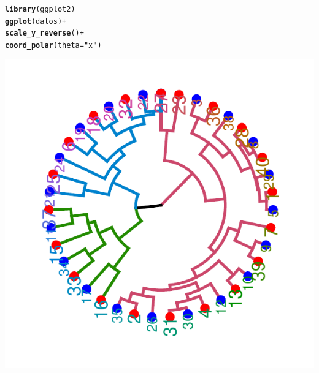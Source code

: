 \documentclass{article}\usepackage[]{graphicx}\usepackage[]{color}
\makeatletter
\def\maxwidth{ %
  \ifdim\Gin@nat@width>\linewidth
    \linewidth
  \else
    \Gin@nat@width
  \fi
}
\newcommand{\hlstr}[1]{\textcolor[rgb]{0.192,0.494,0.8}{#1}}%
\newcommand{\hlopt}[1]{\textcolor[rgb]{0,0,0}{#1}}%
\newcommand{\hlstd}[1]{\textcolor[rgb]{0.345,0.345,0.345}{#1}}%
\newcommand{\hlkwc}[1]{\textcolor[rgb]{0.333,0.667,0.333}{#1}}%
\newcommand{\hlkwd}[1]{\textcolor[rgb]{0.737,0.353,0.396}{\textbf{#1}}}%
\newenvironment{kframe}{%
 \def\at@end@of@kframe{}%
 \ifinner\ifhmode%
  \def\at@end@of@kframe{\end{minipage}}%
  \begin{minipage}{\columnwidth}%
 \fi\fi%
 \def\FrameCommand##1{\hskip\@totalleftmargin \hskip-\fboxsep
 \colorbox{shadecolor}{##1}\hskip-\fboxsep
     \hskip-\linewidth \hskip-\@totalleftmargin \hskip\columnwidth}%
 \MakeFramed {\advance\hsize-\width
   \@totalleftmargin\z@ \linewidth\hsize
   \@setminipage}}%
 {\par\unskip\endMakeFramed%
 \at@end@of@kframe}
\newenvironment{knitrout}{}{} %
\makeatother
\begin{document}
\begin{knitrout}
\color{fgcolor}\begin{kframe}
\begin{alltt}
\hlkwd{library}\hlstd{(ggplot2)}
\hlkwd{ggplot}\hlstd{(datos)} \hlopt{+}
    \hlkwd{scale_y_reverse}\hlstd{()} \hlopt{+}
    \hlkwd{coord_polar}\hlstd{(}\hlkwc{theta} \hlstd{=} \hlstr{"x"}\hlstd{)}
\end{alltt}
\end{kframe}

{\centering \includegraphics[width=\maxwidth]{figure/plot_dendo_ggplot2-1} 

}



\end{knitrout}
\clearpage
\end{document}

